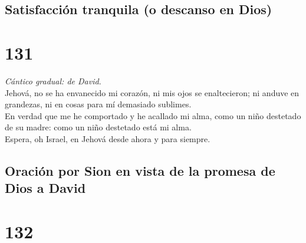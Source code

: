 \hypertarget{satisfacciuxf3n-tranquila-o-descanso-en-dios}{%
\subsection{Satisfacción tranquila (o descanso en
Dios)}\label{satisfacciuxf3n-tranquila-o-descanso-en-dios}}

\hypertarget{section-130}{%
\section{131}\label{section-130}}

 \emph{Cántico gradual: de David.}\\
Jehová, no se ha envanecido mi corazón, ni mis ojos se enaltecieron; ni
anduve en grandezas, ni en cosas para mí demasiado sublimes.\\
 En verdad que me he comportado y he acallado mi alma, como
un niño destetado de su madre: como un niño destetado está mi alma.\\
 Espera, oh Israel, en Jehová desde ahora y para siempre.

\hypertarget{oraciuxf3n-por-sion-en-vista-de-la-promesa-de-dios-a-david}{%
\subsection{Oración por Sion en vista de la promesa de Dios a
David}\label{oraciuxf3n-por-sion-en-vista-de-la-promesa-de-dios-a-david}}

\hypertarget{section-131}{%
\section{132}\label{section-131}}

